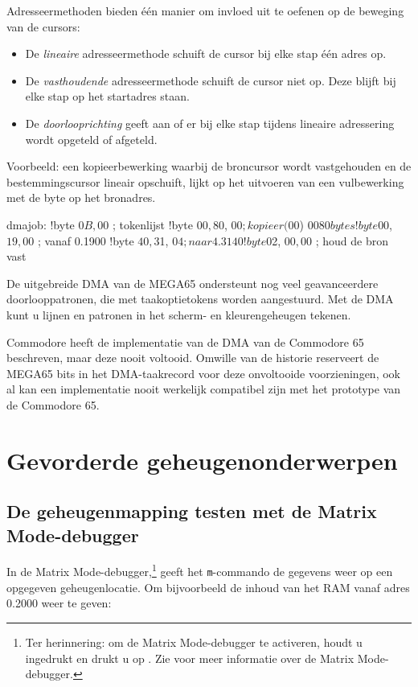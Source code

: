 Adresseermethoden bieden één manier om invloed uit te oefenen op de beweging van de cursors:

\begin{itemize}
\item De {\em lineaire} adresseermethode schuift de cursor bij elke stap één adres op.\item De {\em vasthoudende} adresseermethode schuift de cursor niet op. Deze blijft bij elke stap op het startadres staan.\item De {\em doorlooprichting} geeft aan of er bij elke stap tijdens lineaire adressering wordt opgeteld of afgeteld.
\end{itemize}

Voorbeeld: een kopieerbewerking waarbij de broncursor wordt vastgehouden en de bestemmingscursor lineair opschuift, lijkt op het uitvoeren van een vulbewerking met de byte op het bronadres.

\begin{asmcodesmall}
dmajob:
!byte $0B, $00       ; tokenlijst
!byte $00, $80, $00  ; kopieer ($00) $0080 bytes
!byte $00, $19, $00  ; vanaf 0.1900
!byte $40, $31, $04  ; naar 4.3140
!byte $02, $00, $00  ; houd de bron vast
\end{asmcodesmall}

De uitgebreide DMA van de MEGA65 ondersteunt nog veel geavanceerdere doorlooppatronen, die met taakoptietokens worden aangestuurd. Met de DMA kunt u lijnen en patronen in het scherm- en kleurengeheugen tekenen.

Commodore heeft de implementatie van de DMA van de Commodore 65 beschreven, maar deze nooit voltooid. Omwille van de historie reserveert de MEGA65 bits in het DMA-taakrecord voor deze onvoltooide voorzieningen, ook al kan een implementatie nooit werkelijk compatibel zijn met het prototype van de Commodore 65.


\newpage
\section{Gevorderde geheugenonderwerpen}

\subsection{De geheugenmapping testen met de Matrix Mode-debugger}

In de Matrix Mode-debugger,\footnote{Ter herinnering: om de Matrix Mode-debugger te activeren, houdt u \megasymbolkey ingedrukt en drukt u op . Zie  voor meer informatie over de Matrix Mode-debugger.} geeft het \texttt{m}-commando de gegevens weer op een opgegeven geheugenlocatie. Om bijvoorbeeld de inhoud van het RAM vanaf adres 0.2000 weer te geven:

